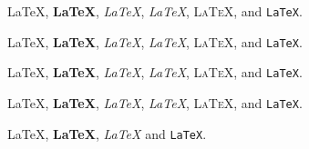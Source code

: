 \documentclass[11pt]{article}
\begin{document}
{\small \LaTeX, \textbf{\LaTeX}, \textit{\LaTeX}, \textsl{\LaTeX}, \textsc{\LaTeX}, and \texttt{\LaTeX}.\par}
{\footnotesize \LaTeX, \textbf{\LaTeX}, \textit{\LaTeX}, \textsl{\LaTeX}, \textsc{\LaTeX}, and \texttt{\LaTeX}.\par}
{\scriptsize \LaTeX, \textbf{\LaTeX}, \textit{\LaTeX}, \textsl{\LaTeX}, \textsc{\LaTeX}, and \texttt{\LaTeX}.\par}
{\normalsize \LaTeX, \textbf{\LaTeX}, \textit{\LaTeX}, \textsl{\LaTeX}, \textsc{\LaTeX}, and \texttt{\LaTeX}.\par}
{\tiny \LaTeX, \textbf{\LaTeX}, \textit{\LaTeX} and \texttt{\LaTeX}.\par}
\end{document}
